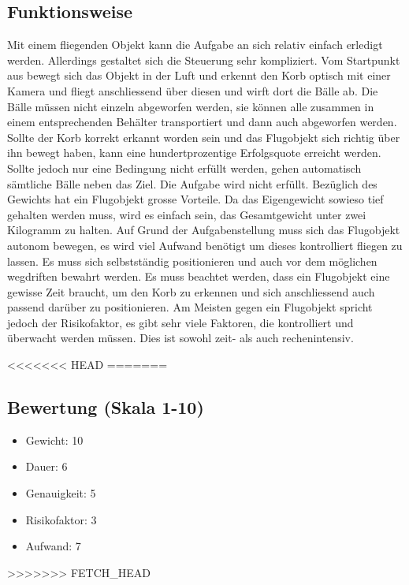 \begin{landscape}
\subsection{Funktionsweise}
Mit einem fliegenden Objekt kann die Aufgabe an sich relativ einfach erledigt werden. Allerdings gestaltet sich die Steuerung sehr kompliziert. Vom Startpunkt aus bewegt sich das Objekt in der Luft und erkennt den Korb optisch mit einer Kamera und fliegt anschliessend über diesen und wirft dort die Bälle ab. Die Bälle müssen nicht einzeln abgeworfen werden, sie können alle zusammen in einem entsprechenden Behälter transportiert und dann auch abgeworfen werden. Sollte der Korb korrekt erkannt worden sein und das Flugobjekt sich richtig über ihn bewegt haben, kann eine hundertprozentige Erfolgsquote erreicht werden. Sollte jedoch nur eine Bedingung nicht erfüllt werden, gehen automatisch sämtliche Bälle neben das Ziel. Die Aufgabe wird nicht erfüllt. Bezüglich des Gewichts hat ein Flugobjekt grosse Vorteile. Da das Eigengewicht sowieso tief gehalten werden muss, wird es einfach sein, das Gesamtgewicht unter zwei Kilogramm zu halten.
Auf Grund der Aufgabenstellung muss sich das Flugobjekt autonom bewegen, es wird viel Aufwand benötigt um dieses kontrolliert fliegen zu lassen. Es muss sich selbstständig positionieren und auch vor dem möglichen wegdriften bewahrt werden. Es muss beachtet werden, dass ein Flugobjekt eine gewisse Zeit braucht, um den Korb zu erkennen und sich anschliessend auch passend darüber zu positionieren. Am Meisten gegen ein Flugobjekt spricht jedoch der Risikofaktor, es gibt sehr viele Faktoren, die kontrolliert und überwacht werden müssen. Dies ist sowohl zeit- als auch rechenintensiv. 

<<<<<<< HEAD
=======
\subsection{Bewertung (Skala 1-10)}
\begin{minipage}{\textwidth}
\begin{itemize}
	\item Gewicht: 10
	\item Dauer: 6
	\item Genauigkeit: 5
	\item Risikofaktor: 3
	\item Aufwand: 7
\end{itemize}
\end{minipage}
>>>>>>> FETCH_HEAD

\clearpage


\end{landscape}
